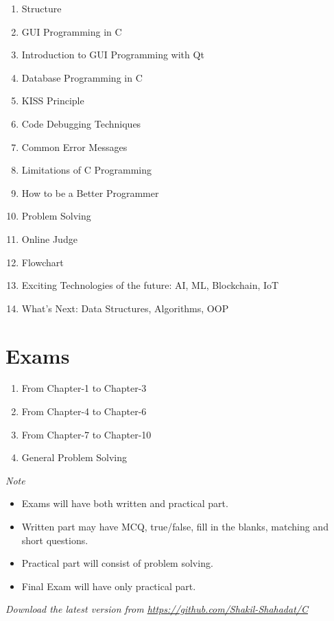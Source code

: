 \documentclass[a4paper,11pt]{article}
\begin{document}
	\begin{enumerate}
		\item Structure
		\item GUI Programming in C
		\item Introduction to GUI Programming with Qt
		\item Database Programming in C
		\item KISS Principle
		\item Code Debugging Techniques
		\item Common Error Messages
		\item Limitations of C Programming
		\item How to be a Better Programmer
		\item Problem Solving
		\item Online Judge
		\item Flowchart
		\item Exciting Technologies of the future: AI, ML, Blockchain, IoT
		\item What’s Next: Data Structures, Algorithms, OOP
	\end{enumerate}


	\section*{ Exams }

	\begin{enumerate}
		\item From Chapter-1 to Chapter-3
		\item From Chapter-4 to Chapter-6
		\item From Chapter-7 to Chapter-10
		\item General Problem Solving
	\end{enumerate}


	\em Note

	\begin{itemize}
		\item Exams will have both written and practical part.
		\item Written part may have MCQ, true/false, fill in the blanks, matching and short questions.
		\item Practical part will consist of problem solving.
		\item Final Exam will have only practical part.
	\end{itemize}

	\vspace*{\fill}
	\em \large Download the latest version from \url{https://github.com/Shakil-Shahadat/C}
\end{document}
